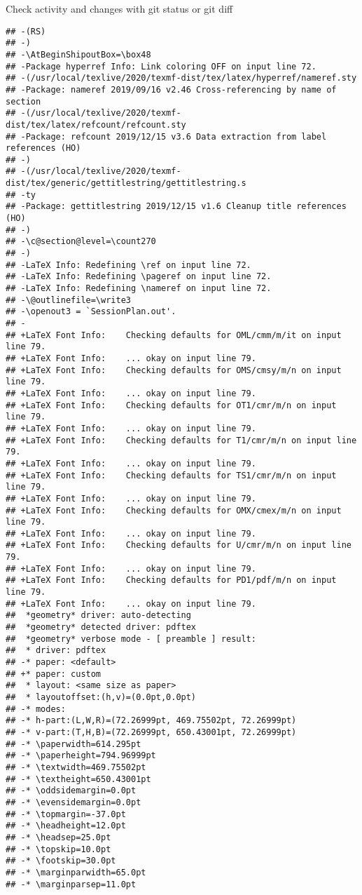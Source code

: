 \documentclass[ignorenonframetext,]{beamer}
\begin{document}
\begin{frame}[fragile]{Check activity and changes with git status or git
diff}
\begin{verbatim}
## -(RS)
## -)
## -\AtBeginShipoutBox=\box48
## -Package hyperref Info: Link coloring OFF on input line 72.
## -(/usr/local/texlive/2020/texmf-dist/tex/latex/hyperref/nameref.sty
## -Package: nameref 2019/09/16 v2.46 Cross-referencing by name of section
## -(/usr/local/texlive/2020/texmf-dist/tex/latex/refcount/refcount.sty
## -Package: refcount 2019/12/15 v3.6 Data extraction from label references (HO)
## -)
## -(/usr/local/texlive/2020/texmf-dist/tex/generic/gettitlestring/gettitlestring.s
## -ty
## -Package: gettitlestring 2019/12/15 v1.6 Cleanup title references (HO)
## -)
## -\c@section@level=\count270
## -)
## -LaTeX Info: Redefining \ref on input line 72.
## -LaTeX Info: Redefining \pageref on input line 72.
## -LaTeX Info: Redefining \nameref on input line 72.
## -\@outlinefile=\write3
## -\openout3 = `SessionPlan.out'.
## -
## +LaTeX Font Info:    Checking defaults for OML/cmm/m/it on input line 79.
## +LaTeX Font Info:    ... okay on input line 79.
## +LaTeX Font Info:    Checking defaults for OMS/cmsy/m/n on input line 79.
## +LaTeX Font Info:    ... okay on input line 79.
## +LaTeX Font Info:    Checking defaults for OT1/cmr/m/n on input line 79.
## +LaTeX Font Info:    ... okay on input line 79.
## +LaTeX Font Info:    Checking defaults for T1/cmr/m/n on input line 79.
## +LaTeX Font Info:    ... okay on input line 79.
## +LaTeX Font Info:    Checking defaults for TS1/cmr/m/n on input line 79.
## +LaTeX Font Info:    ... okay on input line 79.
## +LaTeX Font Info:    Checking defaults for OMX/cmex/m/n on input line 79.
## +LaTeX Font Info:    ... okay on input line 79.
## +LaTeX Font Info:    Checking defaults for U/cmr/m/n on input line 79.
## +LaTeX Font Info:    ... okay on input line 79.
## +LaTeX Font Info:    Checking defaults for PD1/pdf/m/n on input line 79.
## +LaTeX Font Info:    ... okay on input line 79.
##  *geometry* driver: auto-detecting
##  *geometry* detected driver: pdftex
##  *geometry* verbose mode - [ preamble ] result:
##  * driver: pdftex
## -* paper: <default>
## +* paper: custom
##  * layout: <same size as paper>
##  * layoutoffset:(h,v)=(0.0pt,0.0pt)
## -* modes: 
## -* h-part:(L,W,R)=(72.26999pt, 469.75502pt, 72.26999pt)
## -* v-part:(T,H,B)=(72.26999pt, 650.43001pt, 72.26999pt)
## -* \paperwidth=614.295pt
## -* \paperheight=794.96999pt
## -* \textwidth=469.75502pt
## -* \textheight=650.43001pt
## -* \oddsidemargin=0.0pt
## -* \evensidemargin=0.0pt
## -* \topmargin=-37.0pt
## -* \headheight=12.0pt
## -* \headsep=25.0pt
## -* \topskip=10.0pt
## -* \footskip=30.0pt
## -* \marginparwidth=65.0pt
## -* \marginparsep=11.0pt

\end{verbatim}
\end{frame}
\end{document}

